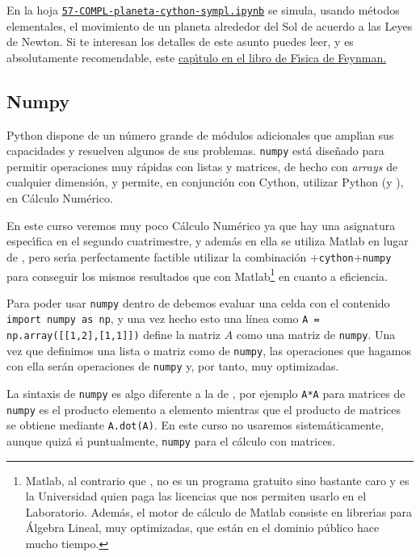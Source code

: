 En la hoja  
\href{http://localhost:8888/notebooks/PROGR/COMPL/57-COMPL-planeta-cython-sympl.ipynb}{\tt 57-COMPL-planeta-cython-sympl.ipynb} se simula, usando m\'etodos elementales, el movimiento de un
planeta alrededor del Sol de acuerdo a las Leyes de Newton. Si te interesan
los detalles de este asunto puedes leer, y es absolutamente recomendable,  este
\href{http://150.244.21.37/PDFs/MISCE/Feynman-V1-Ch09-Newtons-Laws.pdf}{cap\'{\i}tulo en el libro
de F\'{\i}sica de Feynman.} 






\subsection{Numpy}
Python dispone de un número grande de m\'odulos adicionales que ampl\'{\i}an sus
capacidades y resuelven algunos de sus problemas. \lstinline|numpy| est\'a
dise\~nado
para
permitir operaciones muy r\'apidas con listas y matrices, de hecho con {\itshape
arrays} de cualquier dimensi\'on, y permite, en conjunci\'on con Cython, 
utilizar Python (y {\sage}), en C\'alculo Num\'erico. 

En este curso veremos muy poco C\'alculo Num\'erico ya que hay una asignatura
espec\'{\i}fica en el segundo cuatrimestre, y adem\'as en ella se utiliza Matlab
en lugar de {\sage}, pero ser\'{\i}a perfectamente factible utilizar la
combinaci\'on {\sage}+\lstinline|cython|+\lstinline|numpy| para conseguir los mismos
resultados
que con
Matlab\footnote{Matlab, al contrario que {\sage}, no es un programa gratuito
sino bastante caro y es la Universidad quien paga las licencias que nos permiten
usarlo en el Laboratorio. Adem\'as, el motor de c\'alculo de Matlab consiste en 
librer\'{\i}as para \'Algebra Lineal,  muy optimizadas,  que est\'an en el
dominio
p\'ublico hace mucho tiempo.} en cuanto a eficiencia. 

Para poder usar \lstinline|numpy| dentro de {\sage} debemos evaluar una celda
con el
contenido \lstinline|import numpy as np|, y una vez hecho esto una l\'inea como 
\lstinline|A = np.array([[1,2],[1,1]])| define la matriz $A$ como una matriz de
\lstinline|numpy|. Una vez que definimos una lista o matriz como de
\lstinline|numpy|, las
operaciones que hagamos con ella ser\'an operaciones de \lstinline|numpy| y, por
tanto, muy optimizadas.

La sintaxis de \lstinline|numpy| es algo diferente a la de {\sage}, por ejemplo
\lstinline|A*A| para matrices de \lstinline|numpy| es el producto elemento a
elemento
mientras que el producto de matrices se obtiene mediante \lstinline|A.dot(A)|. En este curso no usaremos sistem\'aticamente, aunque quiz\'a s\'{\i}
puntualmente, \lstinline|numpy|  para el c\'alculo con matrices.

